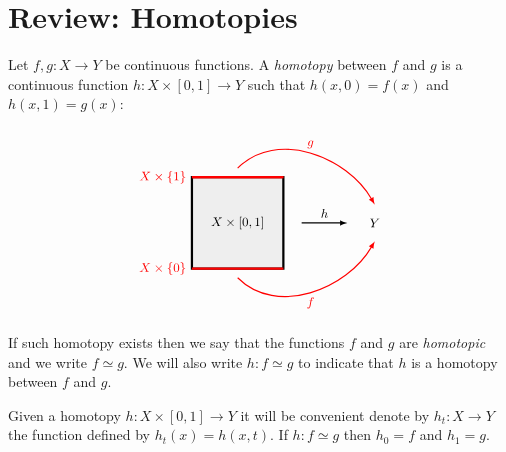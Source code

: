 

\chapter{Review: Homotopies}
\thispagestyle{firststyle}


\begin{definition}
\label{HOMOTOPY DEF}
Let $f, g\colon X \to Y$ be continuous functions. A \emph{homotopy} between $f$ and $g$ is a continuous 
function $h\colon X\times [0, 1]\to Y$ such that $h(x, 0) = f(x)$ and $h(x, 1) = g(x)$: 

\begin{equation*}
\begin{tikzpicture}[
    scale = 2.3,
    d0/.style = {line width = 1.6pt},
    d1/.style= {postaction={decorate}, line width = 1.6pt, decoration={markings, mark=at position 0.55 with {\arrow{stealth}}}},
    d2/.style = {postaction={decorate}, line width = 1.6pt, decoration={markings, mark=at position 0.54 with {\arrow[rotate=9]{stealth}}}},
]

\draw[d0, fill = mygray1] (0,0) rectangle node{\small $X\times [0, 1]$} (1,1);
\draw[d0, red]  (0,0) node[anchor = east] {\small $X\times \{0\}$}  --  (1, 0); 
\draw[d0, red]  (0,1) node[anchor = east] {\small $X\times \{1\}$}  --  (1, 1); 
\draw[d0, red]  (0,1) -- (1,1); 
\node at (2, 0.5) {\small $Y$};
\draw[thick, ->, >=latex] (1.2, 0.5) -- node[anchor=south] {\small $h$} (1.7, 0.5);

\draw[red,thick, ->, >=latex] (0.5, 1.1) to[out=45, in=120] 
node[pos= 0.5, anchor=south] {\small $g$}
(2, 0.7) ;
\draw[red,thick, ->, >=latex] (0.5, -0.1) to[out=-45, in=-120] 
node[pos= 0.5, anchor=north] {\small $f$} 
(2, 0.3);
\end{tikzpicture}
\end{equation*}


If such homotopy exists then we say that the functions $f$ and $g$ are \emph{homotopic} 
and we write $f\simeq g$.  We will also write $h\colon f\simeq g$ to indicate that $h$ is a homotopy 
between $f$ and $g$.  
\end{definition}


\begin{note}
Given a homotopy $h\colon X \times [0, 1] \to Y$ it will be convenient denote by $h_{t}\colon X \to Y$
the function defined by $h_{t}(x) = h(x, t)$. If $h\colon f\simeq g$ then $h_{0} = f$ and $h_{1} = g$. 
\end{note}


